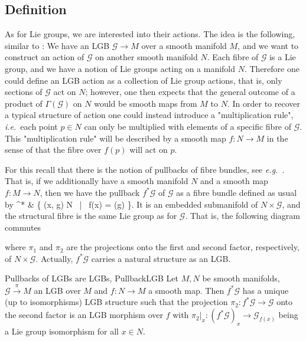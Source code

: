 \documentclass[a4paper,oneside,11pt,bibliography=totoc]{scrartcl}
\def\ba#1\ea{\begin{align}#1\end{align}}
\theoremstyle{plain}
\theoremstyle{remark}
\theoremstyle{definition}
\begin{document}
\subsection{Definition}

As for Lie groups, we are interested into their actions. The idea is the following, similar to \cite[\S 1.6, discussion around Def.\ 1.6.1, page 34]{mackenzieGeneralTheory}: We have an LGB $\mathcal{G} \to M$ over a smooth manifold $M$, and we want to construct an action of $\mathcal{G}$ on another smooth manifold $N$. Each fibre of $\mathcal{G}$ is a Lie group, and we have a notion of Lie groups acting on a manifold $N$. Therefore one could define an LGB action as a collection of Lie group actions, that is, only sections of $\mathcal{G}$ act on $N$; however, one then expects that the general outcome of a product of $\Gamma(\mathcal{G})$ on $N$ would be smooth maps from $M$ to $N$. In order to recover a typical structure of action one could instead introduce a "multiplication rule", \textit{i.e.}~each point $p \in N$ can only be multiplied with elements of a specific fibre of $\mathcal{G}$. This "multiplication rule" will be described by a smooth map $f: N \to M$ in the sense of that the fibre over $f(p)$ will act on $p$.

For this recall that there is the notion of pullbacks of fibre bundles, see \textit{e.g.}\ \cite[\S 4.1.4, page 203ff.; especially Thm.\ 4.1.17, page 204f.]{Hamilton}. That is, if we additionally have a smooth manifold $N$ and a smooth map $f: M \to N$, then we have the pullback $f^*\mathcal{G}$ of $\mathcal{G}$ as a fibre bundle defined as usual by
\ba
f^*
&\coloneqq
\left\{
	(x, g) \in N \times {} ~\middle|~
	f(x) = \pi(g)
\right\}.
\ea
It is an embedded submanifold of $N \times \mathcal{G}$, and the structural fibre is the same Lie group as for $\mathcal{G}$.
That is, the following diagram commutes
\begin{center}
\end{center}
where $\pi_1$ and $\pi_2$ are the projections onto the first and second factor, respectively, of $N \times \mathcal{G}$. Actually, $f^*\mathcal{G}$ carries a natural structure as an LGB.

\begin{corollaries}{Pullbacks of LGBs are LGBs, \newline \cite[\S 2.3, simplified situation of the discussion around Prop.\ 2.3.1, page 63ff.]{mackenzieGeneralTheory}}{PullbackLGB}
Let $M, N$ be smooth manifolds, $\mathcal{G} \stackrel{\pi}{\to} M$ an LGB over $M$ and $f: N \to M$ a smooth map. Then $f^*\mathcal{G}$ has a unique (up to isomorphisms) LGB structure such that the projection $\pi_2: f^*\mathcal{G} \to \mathcal{G}$ onto the second factor is an LGB morphism over $f$ with $\pi_2|_x: (f^*\mathcal{G})_x \to \mathcal{G}_{f(x)}$ being a Lie group isomorphism for all $x \in N$.
%
\end{corollaries}
\end{document}
